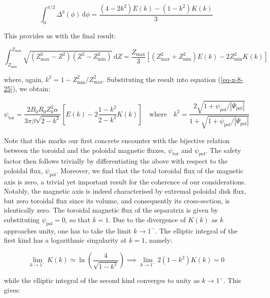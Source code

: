 \begin{enumerate}
    \begin{equation}
        \int_0^{\pi/2}\Delta^3(\phi)\,\mathrm{d}\phi=\frac{(4-2k^2)E(k)-(1-k^2)K(k)}{3}
    \end{equation}

    This provides us with the final result:

    \begin{equation*}
        \int_{Z_\text{min}}^{Z_\text{max}}\sqrt{(Z_\text{max}^2-Z^2)(Z^2-Z_\text{min}^2)}\,\mathrm{d}Z=\frac{Z_\text{max}}{3}\left[(Z_\text{max}^2+Z_\text{min}^2)E(k)-2Z_\text{min}^2K(k)\right]
    \end{equation*}

    where, again, $k^2=1-Z_\text{min}^2/Z_\text{max}^2$. Substituting the result into equation (\ref{eq-x-8-25}), we obtain:

    \begin{equation}
        \psi_\text{tor}=\frac{2B_0R_0Z_0^2\alpha}{3\pi\beta\sqrt{2-k^2}}\left[E(k)-2\frac{1-k^2}{2-k^2}K(k)\right]\quad\text{where}\quad k^2=\frac{2\sqrt{1+\psi_\text{pol}/|\Psi_\text{pol}|}}{1+\sqrt{1+\psi_\text{pol}/|\Psi_\text{pol}|}}
    \end{equation}

    Note that this marks our first concrete encounter with the bijective relation between the toroidal and the poloidal magnetic fluxes, $\psi_\text{tor}$ and $\psi_\text{pol}$. The safety factor then follows trivially by differentiating the above with respect to the poloidal flux, $\psi_\text{pol}$. Moreover, we find that the total toroidal flux of the magnetic axis is zero, a trivial yet important result for the coherence of our considerations. Notably, the magnetic axis is indeed characterised by extremal poloidal disk flux, but zero toroidal flux since its volume, and consequently its cross-section, is identically zero. The toroidal magnetic flux of the separatrix is given by substituting $\psi_\text{pol}=0$, so that $k=1$. Due to the divergence of $K(k)$ as $k$ approaches unity, one has to take the limit $k\to1^-$. The elliptic integral of the first kind has a logarithmic singularity at $k=1$, namely:

    \begin{equation}
        \lim_{k\to1^-}K(k)\simeq\ln{\left(\frac{4}{\sqrt{1-k^2}}\right)}\implies\lim_{k\to1^-}2(1-k^2)K(k)=0
    \end{equation}

    while the elliptic integral of the second kind converges to unity as $k\to1^-$. This gives:


\end{enumerate}
